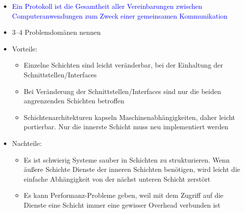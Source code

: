 \begin{itemize}
    \item \textcolor{blue}{Ein Protokoll ist die Gesamtheit aller Vereinbarungen zwischen Computeranwendungen zum Zweck einer gemeinsamen Kommunikation}
\end{itemize}

\begin{itemize}
    \item {} 3–4 Problemdomänen nennen
\end{itemize}

\begin{itemize}
    \item Vorteile:
    \begin{itemize}
        \item Einzelne Schichten sind leicht veränderbar, bei der Einhaltung der Schnittstellen/Interfaces
        \item Bei Veränderung der Schnittstellen/Interfaces sind nur die beiden angrenzenden Schichten betroffen
        \item Schichtenarchitekturen kapseln Maschinenabhängigkeiten, daher leicht portierbar.
        Nur die innerste Schicht muss neu implementiert werden
    \end{itemize}
    \item Nachteile:
    \begin{itemize}
        \item Es ist schwierig Systeme sauber in Schichten zu strukturieren.
        Wenn äußere Schichte Dienste der inneren Schichten benötigen, wird leicht die einfache Abhängigkeit von der nächst unteren Schicht zerstört
        \item Es kann Performanz-Probleme geben, weil mit dem Zugriff auf die Dienste eine Schicht immer eine gewisser Overhead verbunden ist
    \end{itemize}
\end{itemize}

